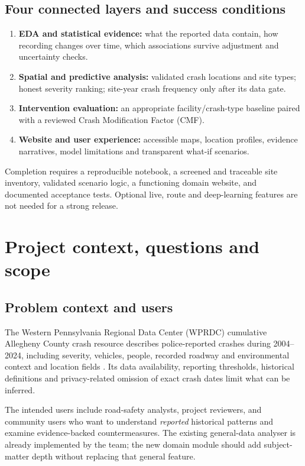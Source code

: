 \documentclass[11pt,a4paper,openany]{report}
\begin{document}
\section{Four connected layers and success conditions}
\begin{enumerate}
\item \textbf{EDA and statistical evidence:} what the reported data contain, how recording changes over time, which associations survive adjustment and uncertainty checks.
\item \textbf{Spatial and predictive analysis:} validated crash locations and site types; honest severity ranking; site-year crash frequency only after its data gate.
\item \textbf{Intervention evaluation:} an appropriate facility/crash-type baseline paired with a reviewed Crash Modification Factor (CMF).
\item \textbf{Website and user experience:} accessible maps, location profiles, evidence narratives, model limitations and transparent what-if scenarios.
\end{enumerate}
Completion requires a reproducible notebook, a screened and traceable site inventory, validated scenario logic, a functioning domain website, and documented acceptance tests. Optional live, route and deep-learning features are not needed for a strong release.

\chapter{Project context, questions and scope}
\section{Problem context and users}
The Western Pennsylvania Regional Data Center (WPRDC) cumulative Allegheny County crash resource describes police-reported crashes during 2004--2024, including severity, vehicles, people, recorded roadway and environmental context and location fields \cite{WPRDC}. Its data availability, reporting thresholds, historical definitions and privacy-related omission of exact crash dates limit what can be inferred.

The intended users include road-safety analysts, project reviewers, and community users who want to understand \emph{reported} historical patterns and examine evidence-backed countermeasures. The existing general-data analyser is already implemented by the team; the new domain module should add subject-matter depth without replacing that general feature.
\end{document}
